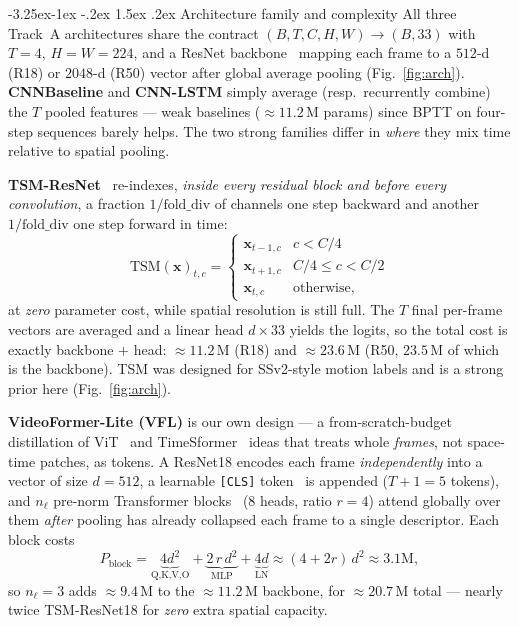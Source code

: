 \documentclass[10pt,twocolumn,letterpaper]{article}
\makeatletter
\renewcommand\subsubsection{\@startsection{subsubsection}{3}{\z@}%
  {-3.25ex\@plus -1ex \@minus -.2ex}%
  {1.5ex \@plus .2ex}%
  {\normalfont\normalsize\bfseries}}
\makeatother
\begin{document}
\subsubsection{Architecture family and complexity}
\label{sec:arch}
All three Track~A architectures share the contract $(B, T, C, H, W) \to
(B, 33)$ with $T{=}4$, $H{=}W{=}224$, and a ResNet
backbone~\cite{he2016resnet} mapping each frame to a $512$-d (R18) or
$2048$-d (R50) vector after global average pooling (Fig.~\ref{fig:arch}). \textbf{CNNBaseline} and
\textbf{CNN-LSTM} simply average (resp.\ recurrently combine) the $T$ pooled
features --- weak baselines ($\approx\!11.2$\,M params) since BPTT on
four-step sequences barely helps. The two strong families differ in
\emph{where} they mix time relative to spatial pooling.

\noindent\textbf{TSM-ResNet}~\cite{lin2019tsm} re-indexes, \emph{inside every
residual block and before every convolution}, a fraction
$1/\text{fold\_div}$ of channels one step backward and another
$1/\text{fold\_div}$ one step forward in time:
\begin{equation}
  \text{TSM}(\mathbf{x})_{t,c} = \begin{cases}
  \mathbf{x}_{t-1,c} & c < C/4 \\
  \mathbf{x}_{t+1,c} & C/4 \leq c < C/2 \\
  \mathbf{x}_{t,c}   & \text{otherwise,}
  \end{cases}
  \label{eq:tsm}
\end{equation}
at \emph{zero} parameter cost, while spatial resolution is still full. The $T$
final per-frame vectors are averaged and a linear head $d\!\times\!33$ yields
the logits, so the total cost is exactly backbone $+$ head:
$\approx\!11.2$\,M (R18) and $\approx\!23.6$\,M (R50, $23.5$\,M of which is the
backbone). TSM was designed for SSv2-style motion labels and is a strong prior
here (Fig.~\ref{fig:arch}).

\noindent\textbf{VideoFormer-Lite (VFL)} is our own design --- a
from-scratch-budget distillation of ViT~\cite{dosovitskiy2021vit} and
TimeSformer~\cite{bertasius2021timesformer} ideas that treats whole
\emph{frames}, not space-time patches, as tokens. A ResNet18 encodes each
frame \emph{independently} into a vector of size $d{=}512$, a learnable
\texttt{[CLS]} token~\cite{dosovitskiy2021vit} is appended ($T{+}1{=}5$
tokens), and $n_\ell$ pre-norm Transformer
blocks~\cite{xiong2020prenorm} (8 heads, ratio $r{=}4$) attend globally over
them \emph{after} pooling has already collapsed each frame to a single
descriptor. Each block costs
\begin{equation}
  P_{\text{block}} = \underbrace{4d^2}_{\text{Q,K,V,O}} +
  \underbrace{2\,r\,d^2}_{\text{MLP}} + \underbrace{4d}_{\text{LN}}
  \approx (4 + 2r)\,d^2 \approx 3.1\text{M},
  \label{eq:vfl_params}
\end{equation}
so $n_\ell{=}3$ adds ${\approx}9.4$\,M to the ${\approx}11.2$\,M backbone, for
${\approx}20.7$\,M total --- nearly twice TSM-ResNet18 for \emph{zero} extra
spatial capacity.
\end{document}
